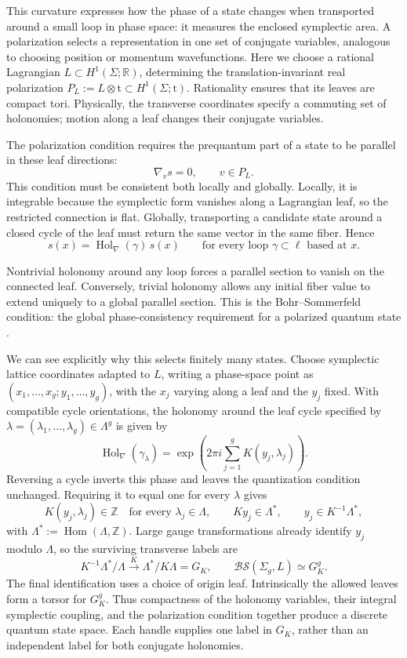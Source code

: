 \documentclass[12pt]{amsart}
\numberwithin{equation}{section}
\theoremstyle{definition}
\begin{document}
This curvature expresses how the phase of a state changes when transported around a small loop in phase space: it measures the enclosed symplectic area.  A polarization selects a representation in one set of conjugate variables, analogous to choosing position or momentum wavefunctions. Here we choose a rational Lagrangian $L\subset H^1(\Sigma;\mathbb R)$, determining the translation-invariant real polarization $P_L:=L\otimes \mathrm t\subset H^1(\Sigma;\mathrm t).$ Rationality ensures that its leaves are compact tori. Physically, the transverse coordinates specify a commuting set of holonomies; motion along a leaf changes their conjugate variables.

The polarization condition requires the prequantum part of a state to be parallel in these leaf directions:
$$
\nabla_v s=0,\qquad v\in P_L.
$$
This condition must be consistent both locally and globally. Locally, it is integrable because the symplectic form vanishes along a Lagrangian leaf, so the restricted connection is flat. Globally, transporting a candidate state around a closed cycle of the leaf must return the same vector in the same fiber. Hence
$$
s(x)=\operatorname{Hol}_{\nabla}(\gamma)\,s(x)
\qquad
\text{for every loop }\gamma\subset\ell
\text{ based at }x.
$$

Nontrivial holonomy around any loop forces a parallel section to vanish on the connected leaf. Conversely, trivial holonomy allows any initial fiber value to extend uniquely to a global parallel section. This is the Bohr--Sommerfeld condition: the global phase-consistency requirement for a polarized quantum state \cite[Sec.~5.1]{Manoliu2}.

We can see explicitly why this selects finitely many states. Choose symplectic lattice coordinates adapted to $L$, writing a phase-space point as $(x_1,\ldots,x_g;y_1,\ldots,y_g)$, with the $x_j$ varying along a leaf and the $y_j$ fixed. With compatible cycle orientations, the holonomy around the leaf cycle
specified by $\lambda=(\lambda_1,\ldots,\lambda_g)\in\Lambda^g$ is
given by \cite{Galviz2}
$$
\operatorname{Hol}_{\nabla}(\gamma_\lambda)
=\exp\!\left(2\pi i\sum_{j=1}^g K(y_j,\lambda_j)\right).
$$
Reversing a cycle inverts this phase and leaves the quantization condition unchanged. Requiring it to equal one for every $\lambda$ gives
$$
K(y_j,\lambda_j)\in\mathbb Z\quad\text{for every }\lambda_j\in\Lambda,
\qquad
Ky_j\in\Lambda^*,
\qquad
y_j\in K^{-1}\Lambda^*, 
$$
with $\Lambda^*:=\operatorname{Hom}(\Lambda,\mathbb Z)$. Large gauge transformations already identify $y_j$ modulo $\Lambda$, so the surviving transverse labels are
$$
K^{-1}\Lambda^*/\Lambda\xrightarrow{\;K\;}\Lambda^*/K\Lambda=G_K,
\qquad
\mathcal{BS}(\Sigma_g,L)\simeq G_K^g.
$$
The final identification uses a choice of origin leaf. Intrinsically the allowed leaves form a torsor for $G_K^g$. Thus compactness of the holonomy variables, their integral symplectic coupling, and the polarization condition together produce a discrete quantum state space. Each handle supplies one label in $G_K$, rather than an independent label for both conjugate holonomies.
\end{document}
